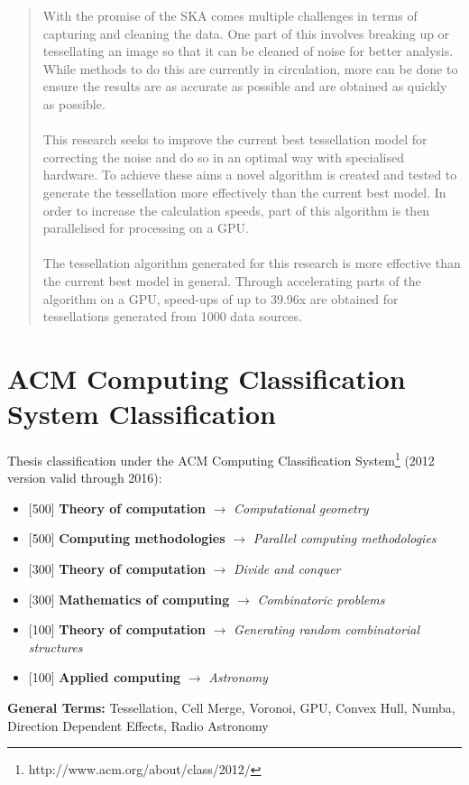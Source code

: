 \begin{abstract}
With the promise of the SKA comes multiple challenges in terms of capturing and cleaning the data. One part of this involves breaking up or tessellating an image so that it can be cleaned of noise for better analysis. While methods to do this are currently in circulation, more can be done to ensure the results are as accurate as possible and are obtained as quickly as possible.
\\
\\
This research seeks to improve the current best tessellation model for correcting the noise and do so in an optimal way with specialised hardware. To achieve these aims a novel algorithm is created and tested to generate the tessellation more effectively than the current best model. In order to increase the calculation speeds, part of this algorithm is then parallelised for processing on a GPU.
\\
\\
The tessellation algorithm generated for this research is more effective than the current best model in general. Through accelerating parts of the algorithm on a GPU, speed-ups of up to 39.96x are obtained for tessellations generated from 1000 data sources.
\end{abstract}

\chapter*{ACM Computing Classification System Classification}
Thesis classification under the ACM Computing Classification System\footnote{http://www.acm.org/about/class/2012/} (2012 version valid through 2016):

\begin{itemize}
\item {[500] \textbf{Theory of computation} $\rightarrow$ \em {Computational geometry} }
\item {[500] \textbf{Computing methodologies} $\rightarrow$ \em {Parallel computing methodologies} }
\item {[300] \textbf{Theory of computation} $\rightarrow$ \em {Divide and conquer} }
\item {[300] \textbf{Mathematics of computing} $\rightarrow$ \em {Combinatoric problems} }
\item {[100] \textbf{Theory of computation} $\rightarrow$ \em {Generating random combinatorial structures} }
\item {[100] \textbf{Applied computing} $\rightarrow$ \em {Astronomy} }
\end{itemize}
\textbf{General Terms:} Tessellation, Cell Merge, Voronoi, GPU, Convex Hull, Numba, Direction Dependent Effects, Radio Astronomy

